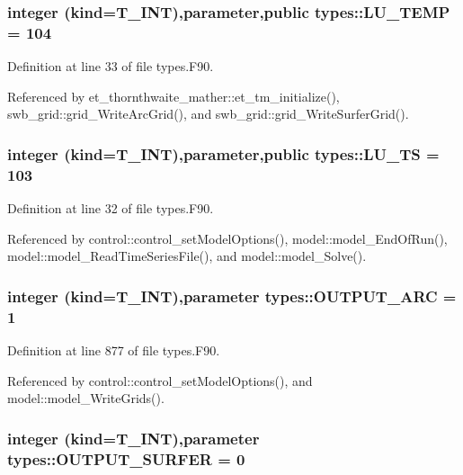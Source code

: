 \hypertarget{namespacetypes_ad52e13854a39857c28903d06b6743e5c}{
\subsubsection[{LU\_\-TEMP}]{\setlength{\rightskip}{0pt plus 5cm}integer (kind={\bf T\_\-INT}),parameter,public {\bf types::LU\_\-TEMP} = 104}}
\label{namespacetypes_ad52e13854a39857c28903d06b6743e5c}


Definition at line 33 of file types.F90.



Referenced by et\_\-thornthwaite\_\-mather::et\_\-tm\_\-initialize(), swb\_\-grid::grid\_\-WriteArcGrid(), and swb\_\-grid::grid\_\-WriteSurferGrid().

\hypertarget{namespacetypes_ade712eb10655f5aee16cf18185a3681a}{
\subsubsection[{LU\_\-TS}]{\setlength{\rightskip}{0pt plus 5cm}integer (kind={\bf T\_\-INT}),parameter,public {\bf types::LU\_\-TS} = 103}}
\label{namespacetypes_ade712eb10655f5aee16cf18185a3681a}


Definition at line 32 of file types.F90.



Referenced by control::control\_\-setModelOptions(), model::model\_\-EndOfRun(), model::model\_\-ReadTimeSeriesFile(), and model::model\_\-Solve().

\hypertarget{namespacetypes_ad0c670d8c4ea7e20e1ae2bcdbb37ba24}{
\subsubsection[{OUTPUT\_\-ARC}]{\setlength{\rightskip}{0pt plus 5cm}integer (kind={\bf T\_\-INT}),parameter {\bf types::OUTPUT\_\-ARC} = 1}}
\label{namespacetypes_ad0c670d8c4ea7e20e1ae2bcdbb37ba24}


Definition at line 877 of file types.F90.



Referenced by control::control\_\-setModelOptions(), and model::model\_\-WriteGrids().

\hypertarget{namespacetypes_a6a4c289d08a585bfc0dda1fa41bf2b4a}{
\subsubsection[{OUTPUT\_\-SURFER}]{\setlength{\rightskip}{0pt plus 5cm}integer (kind={\bf T\_\-INT}),parameter {\bf types::OUTPUT\_\-SURFER} = 0}}
\label{namespacetypes_a6a4c289d08a585bfc0dda1fa41bf2b4a}


